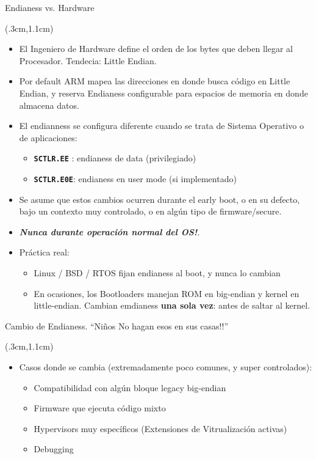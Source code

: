 \documentclass[usenames,table,dvipsnames,aspectratio=169]{beamer}
\begin{document}
\begin{frame}{Endianess vs. Hardware}
 \begin{textblock*}{\textwidth}(.3cm,1.1cm)
  \begin{itemize}[<+(1)->] \justifying
   \item El Ingeniero de Hardware define el orden de los bytes que deben llegar al Procesador. Tendecia: Little Endian.
   \item Por default ARM mapea las direcciones en donde busca código en Little Endian, y reserva Endianess configurable para espacios de memoria en donde almacena datos.
   \item El endianness se configura diferente cuando se trata de Sistema Operativo o de aplicaciones:
   \begin{itemize}
    \item \texttt{\textbf{SCTLR.EE}} : endianess de data (privilegiado)
    \item \textbf{\texttt{SCTLR.E0E}}: endianess en user mode (si implementado)
   \end{itemize}
   \item Se asume que estos cambios ocurren durante el early boot, o en su defecto, bajo un contexto muy controlado, o en algún tipo de firmware/secure.
   \item \textbf{\textit{ {\color{orange}\faExclamationTriangle} \color{red} Nunca durante operación normal del OS!}}.
   \item Práctica real:
   \begin{itemize}
    \item Linux / BSD / RTOS fijan endianess al boot, y nunca lo cambian
    \item En ocasiones, los Bootloaders manejan ROM en big-endian y kernel en little-endian. Cambian emdianess \textbf{una sola vez}: antes de saltar al kernel.
   \end{itemize}
  \end{itemize}
 \end{textblock*}
\end{frame}

\begin{frame}{Cambio de Endianess. ``Niños No hagan esos en sus casas!!''}
 \begin{textblock*}{\textwidth}(.3cm,1.1cm)
  \begin{itemize}[<+(1)->] \justifying
   \item Casos donde se cambia (extremadamente poco comunes, y super controlados):
   \begin{itemize}
    \item Compatibilidad con algún bloque legacy big-endian
    \item Firmware que ejecuta código mixto
    \item Hypervisors muy específicos (Extensiones de Vitrualización activas)
    \item Debugging
   \end{itemize}
  \end{itemize}
 \end{textblock*}
\end{frame}
\end{document}
